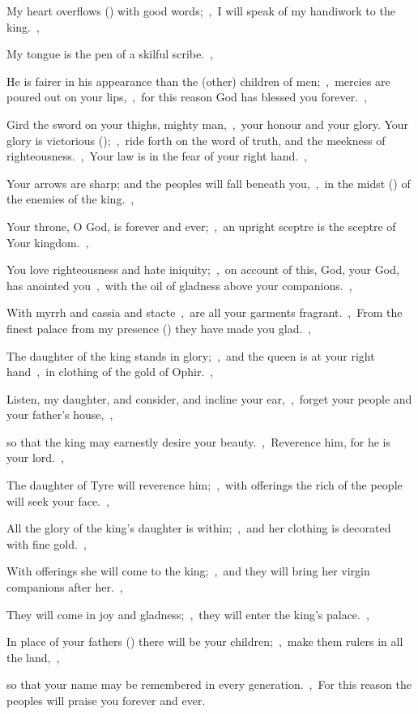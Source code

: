 \documentclass[12pt,twoside,a5paper]{article}
\begin{document}
\begin{normalparskip}
  My heart overflows () with good words;~\sep\ I will speak of my handiwork to the king.~\sep


  My tongue is the pen of a skilful scribe.~\sep

  He is fairer in his appearance than the (other) children of men;~\sep\ mercies are poured out on your lips,~\sep\ for this reason God has blessed you forever.~\sep

  Gird the sword on your thighs, mighty man,~\sep\ your honour and your glory. Your glory is victorious ();~\sep\ ride forth on the word of truth, and the meekness of righteousness.~\sep\ Your law is in the fear of your right hand.~\sep

  Your arrows are sharp; and the peoples will fall beneath you,~\sep\ in the midst () of the enemies of the king.~\sep

  Your throne, O God, is forever and ever;~\sep\ an upright sceptre is the sceptre of Your kingdom.~\sep

  You love righteousness and hate iniquity;~\sep\ on account of this, God, your God, has anointed you~\sep\ with the oil of gladness above your companions.~\sep

  With myrrh and cassia and stacte~\sep\ are all your garments fragrant.~\sep\ From the finest palace from my presence () they have made you glad.~\sep

  The daughter of the king stands in glory;~\sep\ and the queen is at your right hand~\sep\ in clothing of the gold of Ophir.~\sep

  Listen, my daughter, and consider, and incline your ear,~\sep\ forget your people and your father's house,~\sep

  so that the king may earnestly desire your beauty.~\sep\ Reverence him, for he is your lord.~\sep

  The daughter of Tyre will reverence him;~\sep\ with offerings the rich of the people will seek your face.~\sep

  All the glory of the king's daughter is within;~\sep\ and her clothing is decorated with fine gold.~\sep

  With offerings she will come to the king;~\sep\ and they will bring her virgin companions after her.~\sep

  They will come in joy and gladness;~\sep\ they will enter the king's palace.~\sep

  In place of your fathers () there will be your children;~\sep\ make them rulers in all the land,~\sep

  so that your name may be remembered in every generation.~\sep\ For this reason the peoples will praise you forever and ever.
\end{normalparskip}
\end{document}
